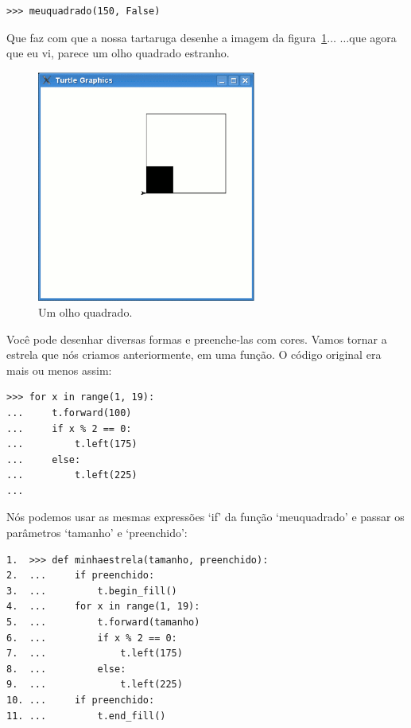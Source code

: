 \begin{listing}
\begin{verbatim}
>>> meuquadrado(150, False)
\end{verbatim}
\end{listing}

\noindent
Que faz com que a nossa tartaruga desenhe a imagem da figura~\ref{fig28}$\ldots$ $\ldots$que agora que eu vi, parece um olho quadrado estranho.

\begin{figure}
\begin{center}
\includegraphics[width=72mm]{eps/figure28.eps}
\end{center}
\caption{Um olho quadrado.}\label{fig28}
\end{figure}

Você pode desenhar diversas formas e preenche-las com cores. Vamos tornar a estrela que nós criamos anteriormente, em uma função. O código original era mais ou menos assim:

\begin{listing}
\begin{verbatim}
>>> for x in range(1, 19):
...     t.forward(100)
...     if x % 2 == 0:
...         t.left(175)
...     else:
...         t.left(225)
...
\end{verbatim}
\end{listing}

Nós podemos usar as mesmas expressões `if' da função `meuquadrado' e passar os parâmetros `tamanho' e `preenchido':

\begin{listing}
\begin{verbatim}
1.  >>> def minhaestrela(tamanho, preenchido):
2.  ...     if preenchido:
3.  ...         t.begin_fill()
4.  ...     for x in range(1, 19):
5.  ...         t.forward(tamanho)
6.  ...         if x % 2 == 0:
7.  ...             t.left(175)
8.  ...         else:
9.  ...             t.left(225)
10. ...     if preenchido:
11. ...         t.end_fill()
\end{verbatim}
\end{listing}

